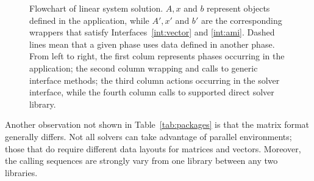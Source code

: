 \documentclass[acmtocl]{acmtrans2m}
\begin{document}
\begin{figure}
\begin{center}
\end{center}
\caption{Flowchart of linear system solution. $A, x$ and $b$ represent objects
  defined in the application, while $A', x'$ and $b'$ are the corresponding 
    wrappers that
    satisfy Interfaces~\ref{int:vector} and \ref{int:ami}. Dashed lines mean
    that a given phase uses data defined in another phase. From left to right,
  the first colum 
    represents phases occurring in the application; the second column wrapping
and calls to generic interface methods; the third column actions
occurring in the solver interface, while the fourth column calls to supported
direct solver library.}
\label{fig:flowchart}
\end{figure}

Another observation not shown in Table~\ref{tab:packages} is that the matrix
format generally differs. Not all solvers can take advantage of
parallel environments; those that do require different data layouts
for matrices and
vectors. Moreover, the calling sequences are strongly vary from one library
between any two libraries.
\end{document}
